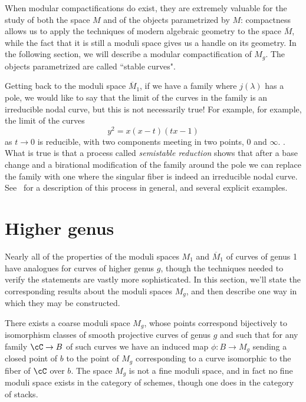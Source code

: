  When modular compactifications do exist, they are extremely valuable for the study of both the space $M$ and of the objects parametrized by $M$: compactness allows us to apply the techniques of modern algebraic geometry to the space $\overline M$, while the fact that it is still a moduli space gives us a handle on its geometry. In the following section, we will describe a modular compactification of $M_g$. The objects parametrized are called ``stable curves". 

Getting back to the moduli space $\overline M_1$, if we have a family where
$j(\lambda)$ has a pole, we would like to say that the limit of the curves in the family is an irreducible nodal curve,
but this is not necessarily true! For example, for example, the limit of the curves
$$
y^2 = x(x-t)(tx-1)
$$
as $t \to 0$ is reducible, with two components meeting in two points, 0 and $\infty$.
. What is true is that a process called \emph{semistable reduction} shows that after a base change and a birational
modification of the family around the pole we can replace the family with one where the singular fiber
is indeed an irreducible nodal curve. See~\cite{MR1631825} for a description of this process in general, and several explicit examples.

\section{Higher genus}

Nearly all of the properties of the moduli spaces $M_1$ and $\overline M_1$ of curves of genus 1 have analogues for curves of higher genus $g$,  though the techniques needed to verify the statements are vastly more sophisticated. In this section, we'll state the corresponding results about the moduli spaces $M_g$, and then describe one way in which they may be constructed.

\begin{theorem}\label{moduli}
There exists a coarse moduli space $M_g$, whose points correspond bijectively to isomorphism classes of smooth projective curves of genus $g$ and such that for any family $\cC \to B$ of such curves we have an induced map $\phi : B \to M_g$ sending a closed point of $b$ to the point of $M_{g}$ corresponding to a curve
isomorphic to the fiber of $\cC$ over $b$. The space $M_g$ is not a fine moduli space, and in fact no fine moduli space exists in the category of schemes, though one does in the category of stacks.
\end{theorem}



